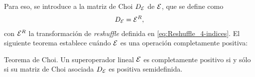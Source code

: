 Para eso, se introduce a la matriz de Choi $D_{\mathcal{E}}$ de $\mathcal{E}$,
que se define como~\cite{bengtsson_zyczkowski_2017}
\begin{align}\label{eq:ChoiMatrix-via-reshuffle}
D_{\mathcal{E}}=\mathcal{E}^{R},
\end{align}
con $\mathcal{E}^R$ la transformación de \textit{reshuffle} definida en 
\eqref{eq:Reshuffle_4-indices}. El siguiente teorema establece 
cuándo $\mathcal{E}$ es una operación completamente positiva:
\begin{thm}{Teorema de Choi.}\label{thm:choi-CP}
Un superoperador lineal $\mathcal{E}$ es completamente positivo si y sólo si 
su matriz de Choi asociada $D_{\mathcal{E}}$ es positiva semidefinida.
\end{thm}
